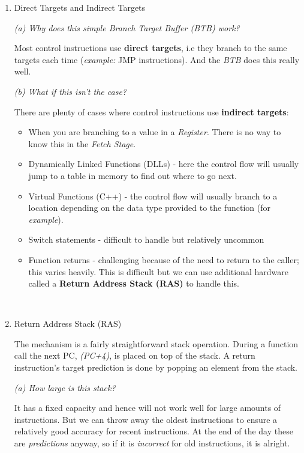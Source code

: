 \documentclass[12pt]{article}
\newenvironment{QandA}{\begin{enumerate}[label=\bfseries\arabic*.]\bfseries}
                      {\end{enumerate}}
\newenvironment{answered}{\par\quad\normalfont}{}
\begin{document}
\begin{QandA}
\ 

\item Direct Targets and Indirect Targets
\begin{answered}
\textit{(a) Why does this simple \textit{Branch Target Buffer (BTB)} work?}

Most control instructions use \textbf{direct targets}, i.e they branch to the same targets each time (\textit{example:} JMP instructions). And the \textit{BTB} does this really well.

\qquad \textit{(b) What if this isn't the case?}

There are plenty of cases where control instructions use \textbf{indirect targets}:
\begin{itemize}
    \item When you are branching to a value in a \textit{Register}. There is no way to know this in the \textit{Fetch Stage}.
    \item Dynamically Linked Functions (DLLs) - here the control flow will usually jump to a table in memory to find out where to go next.
    \item Virtual Functions (C++) - the control flow will usually branch to a location depending on the data type provided to the function (for \textit{example}).
    \item Switch statements - difficult to handle but relatively uncommon
    \item Function returns - challenging because of the need to return to the caller; this varies heavily. This is difficult but we can use additional hardware called a \textbf{Return Address Stack (RAS)} to handle this.
\end{itemize}
\end{answered}

\ 

\item Return Address Stack (RAS)
\begin{answered}
The mechanism is a fairly straightforward stack operation. During a function call the next PC, \textit{(PC+4)}, is placed on top of the stack. A return instruction's target prediction is done by popping an element from the stack.

\textit{(a) How large is this stack?}

It has a fixed capacity and hence will not work well for large amounts of instructions. But we can throw away the oldest instructions to ensure a relatively good accuracy for recent instructions. At the end of the day these are \textit{predictions} anyway, so if it is \textit{incorrect} for old instructions, it is alright.


\end{answered}
\end{QandA}
\end{document}
